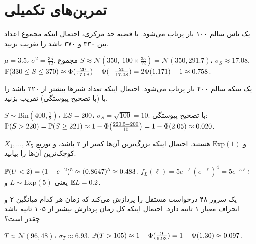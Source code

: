 \section{تمرین‌های تکمیلی}

\begin{exercise}
یک تاس سالم ۱۰۰ بار پرتاب می‌شود. با قضیه حد مرکزی، احتمال اینکه مجموع اعداد بین ۳۳۰ و ۳۷۰ باشد را تقریب بزنید.
\end{exercise}
\begin{solution}
$\mu=3.5$، $\sigma^2=\frac{35}{12}$. مجموع $S\approx\mathcal N(350,\ 100\times\frac{35}{12})=\mathcal N(350,291.7)$، $\sigma_S\approx17.08$.
$\mathbb{P}(330\le S\le370)\approx\Phi(\frac{20}{17.08})-\Phi(-\frac{20}{17.08})=2\Phi(1.171)-1\approx0.758$.
\end{solution}

\begin{exercise}
یک سکه سالم ۴۰۰ بار پرتاب می‌شود. احتمال اینکه تعداد شیرها بیشتر از ۲۲۰ باشد را با  (با تصحیح پیوستگی) تقریب بزنید.
\end{exercise}
\begin{solution}
$S\sim\mathrm{Bin}(400,\frac12)$، $\mathbb{E} S=200$، $\sigma_S=\sqrt{100}=10$. با تصحیح پیوستگی: $\mathbb{P}(S>220)=\mathbb{P}(S\ge221)\approx1-\Phi\big(\frac{220.5-200}{10}\big)=1-\Phi(2.05)\approx0.020$.
\end{solution}

\begin{exercise}
$X_1,\ldots,X_5$  و $\mathrm{Exp}(1)$ هستند. احتمال اینکه بزرگ‌ترین آن‌ها کمتر از ۲ باشد، و توزیع کوچک‌ترین آن‌ها را بیابید.
\end{exercise}
\begin{solution}
$\mathbb{P}(U<2)=(1-e^{-2})^5\approx(0.8647)^5\approx0.483$. $f_L(\ell)=5e^{-\ell}(e^{-\ell})^4=5e^{-5\ell}$؛ یعنی $L\sim\mathrm{Exp}(5)$ و $\mathbb{E} L=0.2$.
\end{solution}

\begin{exercise}
یک سرور ۴۸ درخواست مستقل را پردازش می‌کند که زمان هر کدام میانگین ۲ و انحراف معیار ۱ ثانیه دارد. احتمال اینکه کل زمان پردازش بیشتر از ۱۰۵ ثانیه باشد چقدر است؟
\end{exercise}
\begin{solution}
$T\approx\mathcal N(96,48)$، $\sigma_T\approx6.93$. $\mathbb{P}(T>105)\approx1-\Phi(\frac{9}{6.93})=1-\Phi(1.30)\approx0.097$.
\end{solution}
